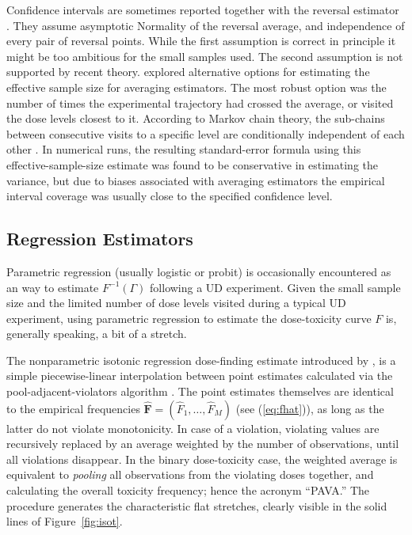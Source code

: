 Confidence intervals are sometimes reported together with the reversal estimator \citep{Capo:Parp:Lyon:Colu:Cell:Mini:2001,Camo:Capo:Lyon:Colu:Epid:2004}. They assume asymptotic Normality of the reversal average, and independence of every pair of reversal points. While the first assumption is correct in principle it might be too ambitious for the small samples used. The second assumption is not supported by recent theory. \cite{Oron07} explored alternative options for estimating the effective sample size for averaging estimators. The most robust option was the number of times the experimental trajectory had crossed the average, or visited the dose levels closest to it. According to Markov chain theory, the sub-chains between consecutive visits to a specific level are conditionally independent of each other \citep{Tsut:rand:1967}. In numerical runs, the resulting standard-error formula using this effective-sample-size estimate was found to be conservative in estimating the variance, but due to biases associated with averaging estimators the empirical interval coverage was usually close to the specified confidence level.

\subsection{Regression Estimators}

Parametric regression (usually logistic or probit) is occasionally encountered as an way to estimate $F^{-1}(\Gamma)$ following a UD experiment. Given the small sample size and the limited number of dose levels visited during a typical UD experiment, using parametric regression to estimate the dose-toxicity curve $F$ is, generally speaking, a bit of a stretch.

The nonparametric isotonic regression dose-finding estimate introduced by \cite{Styl:Flou:dose:2002}, is a simple piecewise-linear interpolation between point estimates calculated via the pool-adjacent-violators algorithm \citep[PAVA,][]{BBBB:order:1972}. The point estimates themselves are identical to the empirical frequencies $\mathbf{\hat{F}}=\left(\hat{F}_1,\ldots,\hat{F}_M\right)$ (see (\ref{eq:fhat})), as long as the latter do not violate monotonicity. In case of a violation, violating values are recursively replaced by an average weighted by the number of observations, until all violations disappear. In the binary dose-toxicity case, the weighted average is equivalent to \emph{pooling} all observations from the violating doses together, and calculating the overall toxicity frequency; hence the acronym ``PAVA.'' The procedure generates the characteristic flat stretches, clearly visible in the solid lines of Figure~\ref{fig:isot}.

